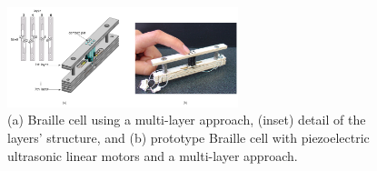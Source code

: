 \begin{figure}\centering
    \includegraphics[width=0.6\textwidth]{figures/piezo-full-design.png}
\caption{(a) Braille cell using a multi-layer approach, (inset) detail of the layers’ structure, and (b) prototype Braille cell with piezoelectric ultrasonic linear motors and a multi-layer approach.}
\label{fig:piezo-full-design}
\end{figure}